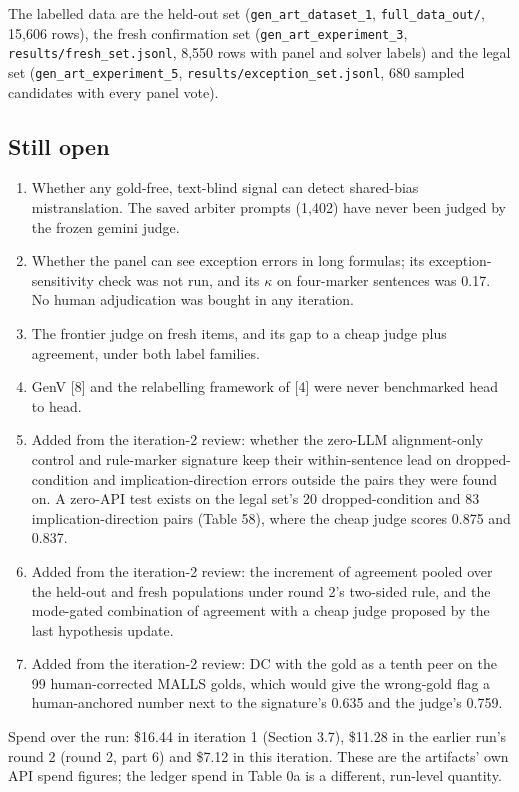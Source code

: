 \documentclass[11pt,letterpaper]{article}
\begin{document}
The labelled data are the held-out set (\texorpdfstring{\textup{\nolinkurl{gen_art_dataset_1}}}{gen art dataset 1}, \texttt{full\_\allowbreak{}\allowbreak{}data\_\allowbreak{}\allowbreak{}out/\allowbreak{}}, 15,606 rows), the fresh confirmation set (\texorpdfstring{\textup{\nolinkurl{gen_art_experiment_3}}}{gen art experiment 3}, \texttt{results/\allowbreak{}fresh\_\allowbreak{}\allowbreak{}set.jsonl}, 8,550 rows with panel and solver labels) and the legal set (\texorpdfstring{\textup{\nolinkurl{gen_art_experiment_5}}}{gen art experiment 5}, \texttt{results/\allowbreak{}exception\_\allowbreak{}\allowbreak{}set.jsonl}, 680 sampled candidates with every panel vote).

\subsection{Still open}

\begin{enumerate}
\item {}Whether any gold-free, text-blind signal can detect shared-bias mistranslation. The saved arbiter prompts (1,402) have never been judged by the frozen gemini judge.
\item {}Whether the panel can see exception errors in long formulas; its exception-sensitivity check was not run, and its $\kappa$ on four-marker sentences was 0.17. No human adjudication was bought in any iteration.
\item {}The frontier judge on fresh items, and its gap to a cheap judge plus agreement, under both label families.
\item {}GenV [8] and the relabelling framework of [4] were never benchmarked head to head.
\item {}Added from the iteration-2 review: whether the zero-LLM alignment-only control and rule-marker signature keep their within-sentence lead on dropped-condition and implication-direction errors outside the pairs they were found on. A zero-API test exists on the legal set's 20 dropped-condition and 83 implication-direction pairs (Table 58), where the cheap judge scores 0.875 and 0.837.
\item {}Added from the iteration-2 review: the increment of agreement pooled over the held-out and fresh populations under round 2's two-sided rule, and the mode-gated combination of agreement with a cheap judge proposed by the last hypothesis update.
\item {}Added from the iteration-2 review: DC with the gold as a tenth peer on the 99 human-corrected MALLS golds, which would give the wrong-gold flag a human-anchored number next to the signature's 0.635 and the judge's 0.759.
\end{enumerate}
Spend over the run: \$16.44 in iteration 1 (Section 3.7), \$11.28 in the earlier run's round 2 (round 2, part 6) and \$7.12 in this iteration. These are the artifacts' own API spend figures; the ledger spend in Table 0a is a different, run-level quantity.
\end{document}
